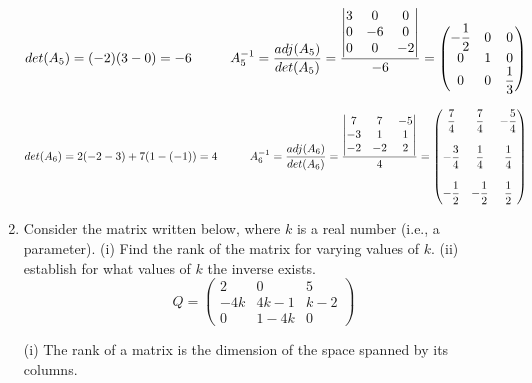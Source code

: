 \documentclass[fleqn]{article}
\begin{document}
\begin{enumerate}
      \textcolor{hwColor}{
        $
        det(A_5)=(-2)(3-0)=-6
        \hskip 1truecm
        A_5^{-1}=\dfrac{adj(A_5)}{det(A_5)}=\dfrac{
          \begin{vmatrix}
           3 & 0 & 0 \\
           0 & -6 & 0 \\
           0 & 0 & -2 \\
          \end{vmatrix}
        }{-6}=\begin{pmatrix}
          -\dfrac{1}{2}& 0 & 0 \\
          0 & 1 & 0 \\
          0 & 0 & \dfrac{1}{3}\\
        \end{pmatrix}
        $
      }

      \textcolor{hwColor}{
        $
        det(A_6)=2(-2-3)+7(1-(-1))=4
        \hskip 1truecm
        A_6^{-1}=\dfrac{adj(A_6)}{det(A_6)}=\dfrac{
          \begin{vmatrix}
           7 & 7 & -5 \\
           -3 & 1 & 1 \\
           -2 & -2 & 2 \\
          \end{vmatrix}
        }{4}=\begin{pmatrix}
         \dfrac{7}{4} & \dfrac{7}{4} & -\dfrac{5}{4} \\
         \\
         -\dfrac{3}{4} & \dfrac{1}{4} & \dfrac{1}{4} \\
         \\
         -\dfrac{1}{2} & -\dfrac{1}{2} & \dfrac{1}{2} \\
        \end{pmatrix}
        $
      }

    \bigbreak
    
    \item  Consider the matrix written below, where $k$ is a real number (i.e., a parameter). (i) Find the rank of the matrix for varying values of $k$. (ii) establish for what values of $k$ the inverse exists. 
      $$
      Q = 
      \begin{pmatrix}
      2 & 0 & 5 \\
      -4k & 4k-1 & k-2 \\
      0 & 1-4k & 0
      \end{pmatrix}
      $$

      \textcolor{hwColor}{
        (i) The rank of a matrix is the dimension of the space spanned by its columns.
      }


\end{enumerate}
\end{document}
